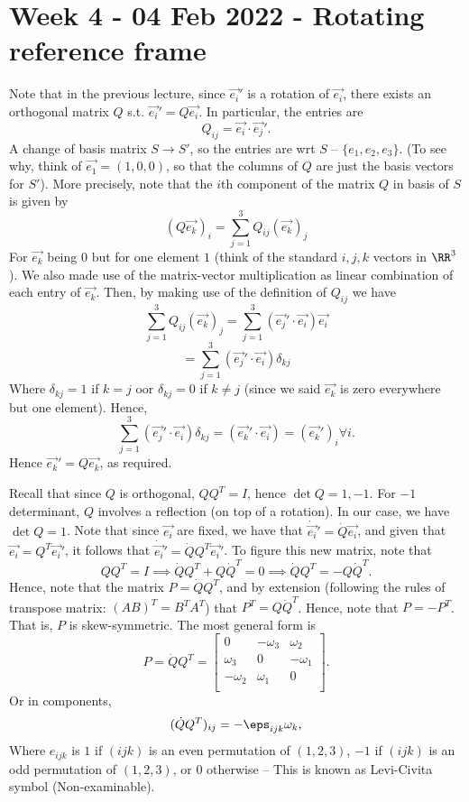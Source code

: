 \section{Week 4 - 04 Feb 2022 - Rotating reference frame}
Note that in the previous lecture, since $\vec{e_i}'$ is a rotation of
$\vec{e_i}$, there exists an orthogonal matrix $Q$ s.t. $\vec{e_i}'=Q\vec{e_i}$.
In particular, the entries are 
\[Q_{ij} = \vec{e_i}\cdot\vec{e_j}'.\]
A change of basis matrix $S\to S'$, so the entries are wrt $S$ --
$\{e_1,e_2,e_3\}$. (To see why, think of $\vec{e_1}=(1,0,0)$, so that the
columns of $Q$ are just the basis vectors for $S'$). More precisely, note that
the $i$th component of the matrix $Q$ in basis of $S$ is given by
\[(Q\vec{e_k})_i = \sum_{j=1}^3 Q_{ij} (\vec{e_k})_j\]
For $\vec{e_k}$ being $0$ but for one element $1$ (think of the standard $i,j,k$
vectors in $\RR^3$). We also made use of the matrix-vector multiplication as
linear combination of each entry of $\vec{e_k}$. Then, by making use of the
definition of $Q_{ij}$ we have 
\[\sum_{j=1}^3 Q_{ij} (\vec{e_k})_j = \sum_{j=1}^3 (\vec{e_j}'\cdot\vec{e_i}) \vec{e_i}\]
\[= \sum_{j=1}^3 (\vec{e_j}'\cdot\vec{e_i})\delta_{kj}\]
Where $\delta_{kj}=1$ if $k=j$ oor $\delta_{kj}=0$ if $k\neq j$ (since we said
$\vec{e_k}$ is zero everywhere but one element). Hence,
\[\sum_{j=1}^3 (\vec{e_j}'\cdot\vec{e_i})\delta_{kj}= (\vec{e_k}'\cdot
\vec{e_i})=(\vec{e_k}')_i \forall i.\]
Hence $\vec{e_k}'=Q\vec{e_k}$, as required.

Recall that since $Q$ is orthogonal, $QQ^T=I$, hence $\det Q=1,-1$. For $-1$
determinant, $Q$ involves a reflection (on top of a rotation). In our case, we
have $\det Q=1$. Note that since $\vec{e_i}$ are fixed, we have that
$\dot{\vec{e_i}}' = \dot{Q}\vec{e_i}$, and given that $\vec{e_i}=Q^T\vec{e_i}'$,
it follows that $\dot{\vec{e_i}}'=\dot{Q}Q^T \vec{e_i}'$. To figure this new
matrix, note that \[QQ^T=I \implies \dot{Q}Q^T + Q\dot{Q}^T =0 \implies
\dot{Q}Q^T = -Q\dot{Q}^T.\] Hence, note that the matrix $P=\dot{Q}Q^T$, and by
extension (following the rules of transpose matrix: $(AB)^T=B^T A^T$) that $P^T
= Q\dot{Q}^T$. Hence, note that $P=-P^T$.  That is, $P$ is skew-symmetric. The
most general form is
\[P=\dot{Q} Q^T = 
  \begin{bmatrix}
    0 & -\omega_3 &\omega_2 \\
    \omega_3 & 0 &-\omega_1 \\
    -\omega_2 & \omega_1 & 0 \\
  \end{bmatrix}.
\]
Or in components,
\[(\dot{Q}Q^T)_{ij} = -\eps_{ijk}\omega_k,\]
Where $e_{ijk}$ is $1$ if $(ijk)$ is an even permutation of $(1,2,3)$, $-1$ if
$(ijk)$ is an odd permutation of $(1,2,3)$, or $0$ otherwise -- This is known as
Levi-Civita symbol (Non-examinable).

